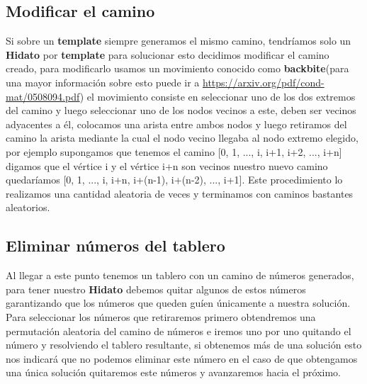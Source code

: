 \documentclass[12pt]{article}
\begin{document}
\subsection{Modificar el camino}
Si sobre un {\bf template} siempre generamos el mismo camino, tendr\'iamos solo un {\bf Hidato} por {\bf template} para solucionar esto decidimos modificar el camino creado, para modificarlo usamos un movimiento conocido como {\bf backbite}(para una mayor informaci\'on sobre esto puede ir a   \url{https://arxiv.org/pdf/cond-mat/0508094.pdf}) el movimiento consiste
en seleccionar uno de los dos extremos del camino y luego seleccionar uno de los nodos vecinos a este, deben ser vecinos adyacentes a \'el, colocamos una arista entre ambos nodos y luego retiramos del camino la arista mediante la cual el nodo vecino llegaba al nodo extremo elegido,
por ejemplo supongamos que tenemos el camino [0, 1, ..., i, i+1, i+2, ..., i+n] digamos que el v\'ertice i y el v\'ertice i+n son vecinos nuestro nuevo camino quedar\'iamos
[0, 1, ..., i, i+n, i+(n-1), i+(n-2), ..., i+1]. Este procedimiento lo realizamos una cantidad aleatoria de veces y terminamos con caminos bastantes aleatorios.
\subsection{Eliminar n\'umeros del tablero}
Al llegar a este punto tenemos un tablero con un camino de n\'umeros generados, para tener nuestro {\bf Hidato} debemos quitar algunos de estos n\'umeros garantizando que los n\'umeros que queden gu\'ien \'unicamente a nuestra soluci\'on.
Para seleccionar los n\'umeros que retiraremos primero obtendremos una permutaci\'on aleatoria del camino de n\'umeros e iremos uno por uno quitando el n\'umero y resolviendo el tablero resultante, si obtenemos m\'as de una soluci\'on esto nos indicar\'a que no podemos eliminar este n\'umero en el caso de que obtengamos una \'unica
soluci\'on quitaremos este n\'umeros y avanzaremos hacia el pr\'oximo.
\end{document}
